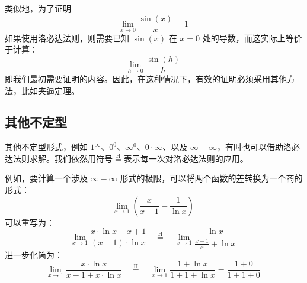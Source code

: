 类似地，为了证明
$$
\lim_{x \to 0} \frac{\sin(x)}{x} = 1~
$$
如果使用洛必达法则，则需要已知 $\sin(x)$ 在 $x=0$ 处的导数，而这实际上等价于计算：
$$
\lim_{h \to 0} \frac{\sin(h)}{h}~
$$
即我们最初需要证明的内容。因此，在这种情况下，有效的证明必须采用其他方法，比如夹逼定理。
\subsection{其他不定型}
其他不定型形式，例如 $1^\infty$、$0^0$、$\infty^0$、$0 \cdot \infty$、以及 $\infty - \infty$，有时也可以借助洛必达法则求解。我们依然用符号$\stackrel{\mathrm{H}}{=}$表示每一次对洛必达法则的应用。

例如，要计算一个涉及 $\infty - \infty$ 形式的极限，可以将两个函数的差转换为一个商的形式：
$$
\lim_{x \to 1} \left( \frac{x}{x - 1} - \frac{1}{\ln x} \right)~
$$
可以重写为：
$$
\lim_{x \to 1} \frac{x \cdot \ln x - x + 1}{(x - 1) \cdot \ln x}
\quad \stackrel{\mathrm{H}}{=}\quad
\lim_{x \to 1} \frac{\ln x}{\frac{x - 1}{x} + \ln x}~
$$
进一步化简为：
$$
\lim_{x \to 1} \frac{x \cdot \ln x}{x - 1 + x \cdot \ln x}
\quad \stackrel{\mathrm{H}}{=}\quad
\lim_{x \to 1} \frac{1 + \ln x}{1 + 1 + \ln x} = \frac{1 + 0}{1 + 1 + 0}~
$$



